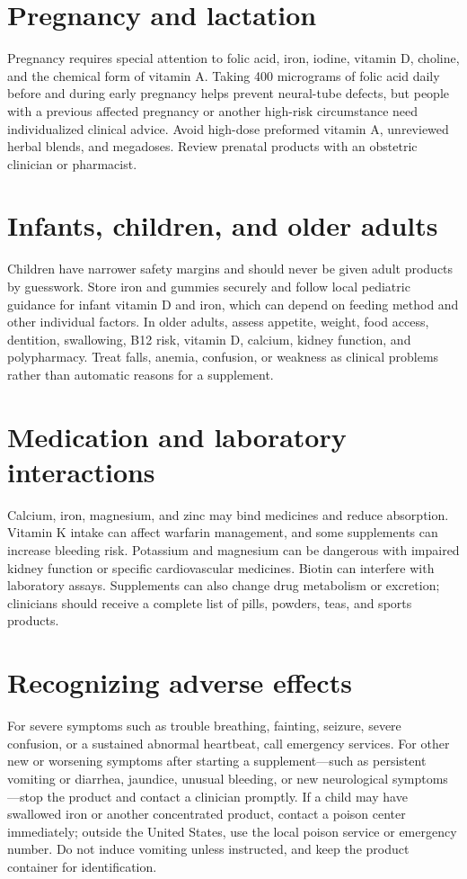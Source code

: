 \section{Pregnancy and lactation}
Pregnancy requires special attention to folic acid, iron, iodine, vitamin D, choline, and the chemical form of vitamin A. Taking 400 micrograms of folic acid daily before and during early pregnancy helps prevent neural-tube defects, but people with a previous affected pregnancy or another high-risk circumstance need individualized clinical advice. \cite{cdcFolate,odsPregnancy} Avoid high-dose preformed vitamin A, unreviewed herbal blends, and megadoses. Review prenatal products with an obstetric clinician or pharmacist.

\section{Infants, children, and older adults}
Children have narrower safety margins and should never be given adult products by guesswork. Store iron and gummies securely and follow local pediatric guidance for infant vitamin D and iron, which can depend on feeding method and other individual factors. \cite{cdcInfantVitaminD,cdcInfantIron} In older adults, assess appetite, weight, food access, dentition, swallowing, B12 risk, vitamin D, calcium, kidney function, and polypharmacy. Treat falls, anemia, confusion, or weakness as clinical problems rather than automatic reasons for a supplement. \cite{odsB12,odsD}

\section{Medication and laboratory interactions}
Calcium, iron, magnesium, and zinc may bind medicines and reduce absorption. Vitamin K intake can affect warfarin management, and some supplements can increase bleeding risk. Potassium and magnesium can be dangerous with impaired kidney function or specific cardiovascular medicines. Biotin can interfere with laboratory assays. Supplements can also change drug metabolism or excretion; clinicians should receive a complete list of pills, powders, teas, and sports products. \cite{fdaInteractions,odsK,odsSafety,fdaBiotin}

\section{Recognizing adverse effects}
For severe symptoms such as trouble breathing, fainting, seizure, severe confusion, or a sustained abnormal heartbeat, call emergency services. For other new or worsening symptoms after starting a supplement---such as persistent vomiting or diarrhea, jaundice, unusual bleeding, or new neurological symptoms---stop the product and contact a clinician promptly. If a child may have swallowed iron or another concentrated product, contact a poison center immediately; outside the United States, use the local poison service or emergency number. Do not induce vomiting unless instructed, and keep the product container for identification. \cite{poisonControl}

